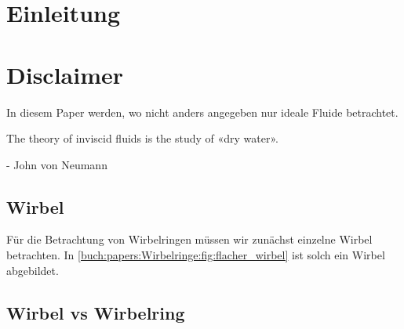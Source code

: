 \section{Einleitung}



\section*{Disclaimer}

In diesem Paper werden, wo nicht anders angegeben nur ideale Fluide betrachtet.

\begin{displayquote}
    The theory of inviscid fluids is the study of «dry water».

    - John von Neumann\cite{Wirbelringe:feynman1964lectures}
\end{displayquote}

\subsection{Wirbel}

Für die Betrachtung von Wirbelringen müssen wir zunächst einzelne Wirbel betrachten. 
In \ref{buch:papers:Wirbelringe:fig:flacher_wirbel} ist solch ein Wirbel abgebildet. 


\subsection{Wirbel vs Wirbelring}
